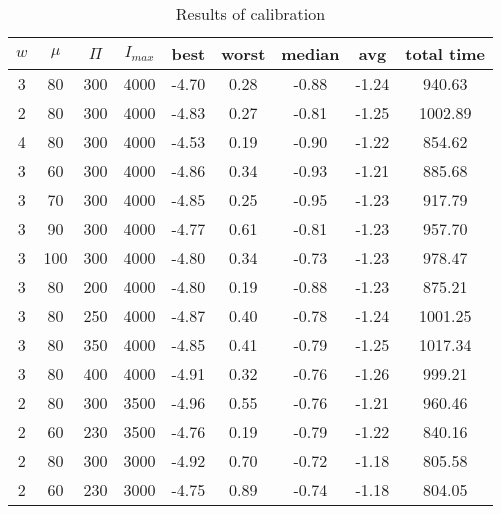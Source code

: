 \begin{table}[]
\centering
\begin{tabular}{@{}ccccccccc@{}}
\toprule
$w$ & $\mu$ & $\Pi$ & $I_{max}$ & best  & worst & median & avg   & total time \\ \midrule
3   & 80    & 300   & 4000    & -4.70 & 0.28  & -0.88  & -1.24 & 940.63     \\
2   & 80    & 300   & 4000    & -4.83 & 0.27  & -0.81  & -1.25 & 1002.89    \\
4   & 80    & 300   & 4000    & -4.53 & 0.19  & -0.90  & -1.22 & 854.62     \\
3   & 60    & 300   & 4000    & -4.86 & 0.34  & -0.93  & -1.21 & 885.68     \\
3   & 70    & 300   & 4000    & -4.85 & 0.25  & -0.95  & -1.23 & 917.79     \\
3   & 90    & 300   & 4000    & -4.77 & 0.61  & -0.81  & -1.23 & 957.70     \\
3   & 100   & 300   & 4000    & -4.80 & 0.34  & -0.73  & -1.23 & 978.47     \\
3   & 80    & 200   & 4000    & -4.80 & 0.19  & -0.88  & -1.23 & 875.21     \\
3   & 80    & 250   & 4000    & -4.87 & 0.40  & -0.78  & -1.24 & 1001.25    \\
3   & 80    & 350   & 4000    & -4.85 & 0.41  & -0.79  & -1.25 & 1017.34    \\
3   & 80    & 400   & 4000    & -4.91 & 0.32  & -0.76  & -1.26 & 999.21     \\
2   & 80    & 300   & 3500    & -4.96 & 0.55  & -0.76  & -1.21 & 960.46     \\
2   & 60    & 230   & 3500    & -4.76 & 0.19  & -0.79  & -1.22 & 840.16     \\
2   & 80    & 300   & 3000    & -4.92 & 0.70  & -0.72  & -1.18 & 805.58     \\
2   & 60    & 230   & 3000    & -4.75 & 0.89  & -0.74  & -1.18 & 804.05     \\ \bottomrule
\end{tabular}
\caption{Results of calibration}
\label{calibration-results}
\end{table}